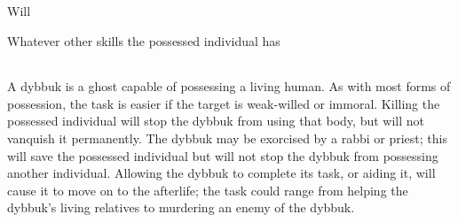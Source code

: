 \begin{npcBox}[title=Dybbuk]

\begin{aspects}
\item {}
\item {}
\item {}
\end{aspects}

\begin{skills}
\item {} Will
\item Whatever other skills the possessed individual has
\end{skills}

\begin{stunts}
\item {}
\end{stunts}

\begin{stressSection}
\end{stressSection}
\begin{tabularx}{\textwidth}{ XX }
\end{tabularx}

\begin{consequences}
\item {}
\item {}
\item {}
\end{consequences}


\begin{npcDescription}
A dybbuk is a ghost capable of possessing a living human. As with most forms of possession, the task is easier if the target is weak-willed or immoral. Killing the possessed individual will stop the dybbuk from using that body, but will not vanquish it permanently. The dybbuk may be exorcised by a rabbi or priest; this will save the possessed individual but will not stop the dybbuk from possessing another individual. Allowing the dybbuk to complete its task, or aiding it, will cause it to move on to the afterlife; the task could range from helping the dybbuk’s living relatives to murdering an enemy of the dybbuk. 
\end{npcDescription}

\end{npcBox}